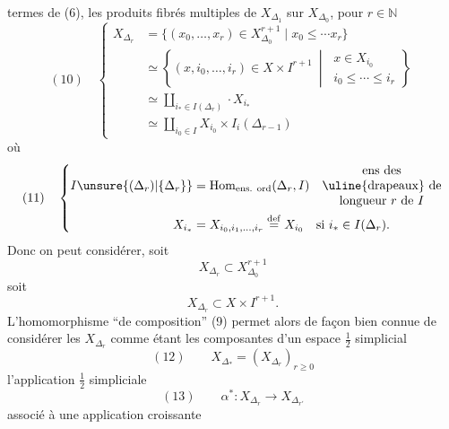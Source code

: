 termes de (6), les produits fibrés
multiples de $X_{\Delta_1}$ sur $X_{\Delta_0}$, pour $r\in\mathbb N$
\[
(10)\quad\left\{\begin{aligned}
X_{\Delta_r}&=\{(x_0,\ldots,x_r)\in X_{\Delta_0}^{r+1}\mid x_0\leq\cdots x_r\}\\
&\simeq\left\{(x,i_0,\ldots,i_r)\in X\times I^{r+1}\ \middle|\ \begin{matrix}x\in X_{i_0}\\i_0\leq\cdots\leq i_r\end{matrix}\right\}\\
&\simeq\coprod_{i_*\in I(\Delta_r)}\cdot X_{i_*}\\
&\simeq\coprod_{i_0\in I}X_{i_0}\times I_i(\Delta_{r-1})
\end{aligned}\right.
\]
où
\[
(11)\quad\left\{\begin{aligned}
I\unsure{(\Delta_r)|\{\Delta_r\}}&=\operatorname{Hom}_{\text{ens. ord}}(\Delta_r,I)
\quad\begin{matrix}\text{ens des}\\\text{\uline{drapeaux} de}\\\text{longueur }r\text{ de }I\end{matrix}\\
X_{i_*}&=X_{i_0,i_1,\ldots,i_r}\overset{\mathrm{def}}{=}X_{i_0}\quad\text{si }i_*\in I(\Delta_r).
\end{aligned}\right.
\]
Donc on peut considérer, soit
\[
X_{\Delta_r}\subset X_{\Delta_0}^{r+1}
\]
soit
\[
X_{\Delta_r}\subset X\times I^{r+1}.
\]
L'homomorphisme ``de composition'' (9)
permet alors de façon bien connue de
considérer les $X_{\Delta_r}$ comme étant les
composantes d'un espace $\frac12$ simplicial
\[
(12)\qquad X_{\Delta_*}=(X_{\Delta_r})_{r\geq0}
\]
 l'application $\frac12$ simpliciale
\[
(13)\qquad\alpha^*:X_{\Delta_r}\longrightarrow X_{\Delta_{r'}}
\]
associé à une application croissante
